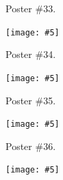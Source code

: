 \documentclass[12pt,oneside]{article}
\newcommand{\embed}[5]{\begin{center}\texttt{[image: \#5]}\end{center}\clearpage}
\newcommand{\onlyposter}[1]{\centerline{\small\noindent Poster \##1.}}
\begin{document}
\onlyposter{33}
\embed{2.5cm}{12cm}{1.8cm}{2.85cm}{51-ANNOgesic.pdf}

\onlyposter{34}
\embed{2.5cm}{3.25cm}{1cm}{2.8cm}{44-bioxsd.pdf}

\onlyposter{35}
\embed{2.5cm}{12cm}{2.25cm}{2.85cm}{60-mgkit.pdf}

\onlyposter{36}
\embed{2.5cm}{2.5cm}{0.25cm}{2.65cm}{64-annot-nf.pdf}

\end{document}

